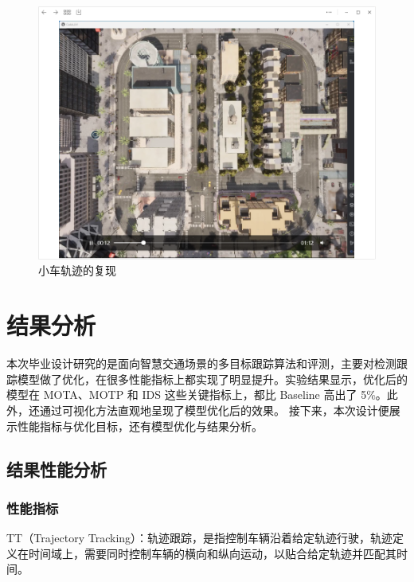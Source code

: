 \begin{figure}[htbp] %
	\centering
	\includegraphics[width=1\textwidth]{p21} %
	\caption{小车轨迹的复现} %
	\label{fig:p21} %
\end{figure}






\section{结果分析}

本次毕业设计研究的是面向智慧交通场景的多目标跟踪算法和评测，主要对检测跟踪模型做了优化，在很多性能指标上都实现了明显提升。实验结果显示，优化后的模型在 MOTA、MOTP 和 IDS 这些关键指标上，都比 Baseline 高出了 5\%。此外，还通过可视化方法直观地呈现了模型优化后的效果。
接下来，本次设计便展示性能指标与优化目标，还有模型优化与结果分析。








\subsection{结果性能分析}
\subsubsection{性能指标}
TT（Trajectory Tracking）：轨迹跟踪，是指控制车辆沿着给定轨迹行驶，轨迹定义在时间域上，需要同时控制车辆的横向和纵向运动，以贴合给定轨迹并匹配其时间。

